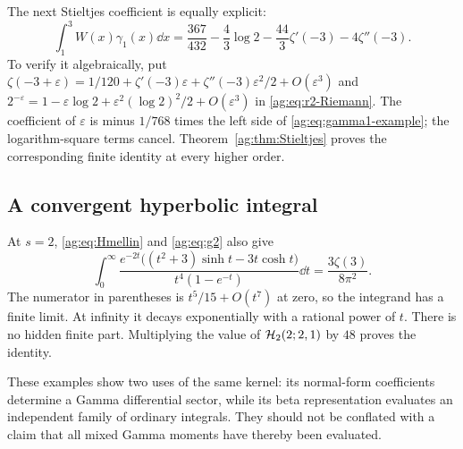 The next Stieltjes coefficient is equally explicit:
\begin{equation}\label{ag:eq:gamma1-example}
 \boxed{
 \int_1^3W(x)\gamma_1(x)\dd x
 =\frac{367}{432}-\frac43\log2
                 -\frac{44}{3}\zeta'(-3)-4\zeta''(-3).}
\end{equation}
To verify it algebraically, put
$\zeta(-3+\varepsilon)=1/120+\zeta'(-3)\varepsilon+
\zeta''(-3)\varepsilon^2/2+O(\varepsilon^3)$ and
$2^{-\varepsilon}=1-\varepsilon\log2+
\varepsilon^2(\log2)^2/2+O(\varepsilon^3)$ in
\eqref{ag:eq:r2-Riemann}. The coefficient of $\varepsilon$ is minus
$1/768$ times the left side of \eqref{ag:eq:gamma1-example}; the
logarithm-square terms cancel. Theorem~\ref{ag:thm:Stieltjes} proves the
corresponding finite identity at every higher order.

\subsection{A convergent hyperbolic integral}
At $s=2$, \eqref{ag:eq:Hmellin} and \eqref{ag:eq:g2} also give
\begin{equation}\label{ag:eq:hyperbolic-integral}
 \boxed{
 \int_0^\infty
 \frac{e^{-2t}\bigl((t^2+3)\sinh t-3t\cosh t\bigr)}
      {t^4(1-e^{-t})}\dd t
 =\frac{3\zeta(3)}{8\pi^2}.}
\end{equation}
The numerator in parentheses is $t^5/15+O(t^7)$ at zero, so the
integrand has a finite limit. At infinity it decays exponentially
with a rational power of $t$. There is no hidden finite part.
Multiplying the value of $\mathcal H_2(2;2,1)$ by $48$ proves the identity.

These examples show two uses of the same kernel: its normal-form
coefficients determine a Gamma differential sector, while its beta
representation evaluates an independent family of ordinary integrals.
They should not be conflated with a claim that all mixed Gamma moments
have thereby been evaluated.
